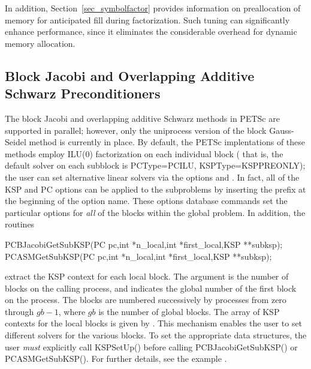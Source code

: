 In addition, Section~\ref{sec_symbolfactor} provides information on
preallocation of memory for anticipated fill during factorization.  
Such tuning can significantly enhance performance, since it
eliminates the considerable overhead for dynamic memory allocation.

\subsection{Block Jacobi and 
            Overlapping Additive Schwarz Preconditioners}
\label{sec_bjacobi}

 
  
The block Jacobi and overlapping additive Schwarz methods in PETSc are
supported in parallel; however, only the uniprocess
version of the block Gauss-Seidel method is currently in place.
By default, the PETSc implentations of these methods
employ ILU(0) factorization on each individual block ( that is, the default solver on each 
subblock is PCType=PCILU, KSPType=KSPPREONLY); the user can set alternative linear solvers via the options 
 
 and . In fact, all of the KSP
and PC options can be applied to the subproblems by inserting the prefix
 at the beginning of the option name. 
These options database commands set the particular options for {\em all} 
of the blocks within the global problem.  In addition, the routines
\begin{tabbing}
  PCBJacobiGetSubKSP(PC pc,int *n\_local,int *first\_local,KSP **subksp);\\
  PCASMGetSubKSP(PC pc,int *n\_local,int *first\_local,KSP **subksp);
\end{tabbing}
extract the KSP context for each local 
block.  The argument  is the number of blocks on the 
calling process, and  indicates the global number 
of the first block on the process. The blocks are numbered 
successively by processes from zero through $ gb-1$, 
where $ gb $ is the number of global blocks.  
The array of KSP contexts for the local blocks is given by . 
This mechanism enables the user to set different solvers for the 
various blocks.  To set the appropriate data structures, the 
user {\em must} explicitly call KSPSetUp() 
before calling PCBJacobiGetSubKSP() or
PCASMGetSubKSP().
For further details, see the 
example .

